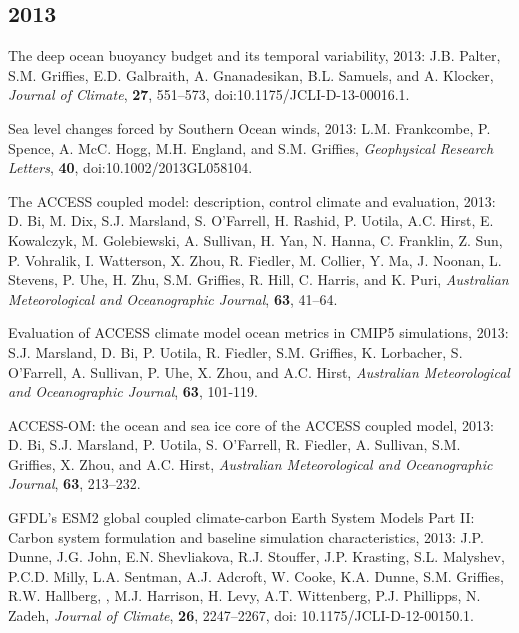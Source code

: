 \begin{etaremune}
\subsection*{\sc \color{Maroon} 2013}

\item The deep ocean buoyancy budget and its temporal variability,  2013: J.B. Palter, S.M. Grif\/f\/ies, E.D. Galbraith,  A. Gnanadesikan, B.L. Samuels, and A. Klocker, {\it Journal of Climate}, {\bf 27}, 551--573,
  doi:10.1175/JCLI-D-13-00016.1.

\item Sea level changes forced by Southern Ocean winds, 2013: L.M. Frankcombe, P. Spence, A. McC. Hogg, M.H. England, and S.M. Grif\/f\/ies, {\it Geophysical Research Letters}, {\bf 40},  doi:10.1002/2013GL058104.

\item The ACCESS coupled model: description, control climate and  evaluation, 2013: D. Bi, M. Dix, S.J. Marsland, S. O'Farrell, H. Rashid, P. Uotila, A.C. Hirst, E. Kowalczyk, M. Golebiewski,
  A. Sullivan, H. Yan, N. Hanna, C. Franklin, Z. Sun, P. Vohralik, I. Watterson, X. Zhou, R. Fiedler, M. Collier, Y. Ma, J. Noonan,  L. Stevens, P. Uhe, H. Zhu, S.M. Grif\/f\/ies, R. Hill, C. Harris, and K. Puri, {\it Australian Meteorological and
    Oceanographic Journal}, {\bf 63}, 41--64.

\item Evaluation of ACCESS climate model ocean metrics in CMIP5 simulations, 2013: S.J. Marsland, D. Bi, P. Uotila, R. Fiedler, S.M. Grif\/f\/ies, K. Lorbacher, S. O'Farrell, A. Sullivan, P. Uhe, X. Zhou, and A.C. Hirst, {\it Australian Meteorological and
    Oceanographic Journal}, {\bf 63}, 101-119.

\item ACCESS-OM: the ocean and sea ice core of the ACCESS coupled model, 2013: D. Bi, S.J. Marsland, P. Uotila, S. O'Farrell, R. Fiedler, A. Sullivan, S.M. Grif\/f\/ies, X. Zhou, and A.C. Hirst, {\it Australian Meteorological and Oceanographic Journal}, {\bf 63}, 213--232.

\item GFDL’s ESM2 global coupled climate-carbon Earth System Models Part II: Carbon system formulation and baseline simulation characteristics, 2013: J.P. Dunne, J.G. John, E.N. Shevliakova, R.J. Stouffer, J.P. Krasting, S.L. Malyshev, P.C.D. Milly,  L.A. Sentman, A.J. Adcroft, W. Cooke, K.A. Dunne, S.M. Grif\/f\/ies, R.W. Hallberg, , M.J. Harrison, H. Levy,  A.T. Wittenberg, P.J. Phillipps, N. Zadeh, {\it Journal of Climate},  {\bf 26}, 2247--2267, doi: 10.1175/JCLI-D-12-00150.1.


\end{etaremune}
